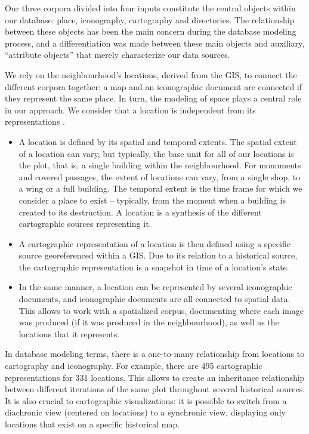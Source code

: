 \documentclass[12pt, a4paper, twocolumn]{article}
\begin{document}
Our three corpora divided into four inputs constitute the central objects within our database: place, iconography, cartography and directories. The relationship between these objects has been the main concern during the database modeling process, and a differentiation was made between these main objects and auxiliary, ``attribute objects'' that merely characterize our data sources.  

We rely on the neighbourhood's locations, derived from the GIS, to connect the different corpora together: a map and an iconographic document are connected if they represent the same place. In turn, the modeling of space plays a central role in our approach. We consider that a location is independent from its representations \parencite{kerveganMarqueLieuDans2023}.

\begin{itemize}
    \item A location is defined by its spatial and temporal extents. The spatial extent of a location can vary, but typically, the base unit for all of our locations is the plot, that is, a single building within the neighbourhood. For monuments and covered passages, the extent of locations can vary, from a single shop, to a wing or a full building. The temporal extent is the time frame for which we consider a place to exist -- typically, from the moment when a building is created to its destruction. A location is a synthesis of the different cartographic sources representing it.
    \item A cartographic representation of a location is then defined using a specific source georeferenced within a GIS. Due to its relation to a historical source, the cartographic representation is a snapshot in time of a location's state.
    \item In the same manner, a location can be represented by several iconographic documents, and iconographic documents are all connected to spatial data. This allows to work with a spatialized corpus, documenting where each image was produced (if it was produced in the neighbourhood), as well as the locations that it represents.
\end{itemize}

In database modeling terms, there is a one-to-many relationship from locations to cartography and iconography. For example, there are 495 cartographic representations for 331 locations. This allows to create an inheritance relationship between different iterations of the same plot throughout several historical sources. It is also crucial to cartographic visualizations: it is possible to switch from a diachronic view (centered on locations) to a synchronic view, displaying only locations that exist on a specific historical map.
\end{document}
